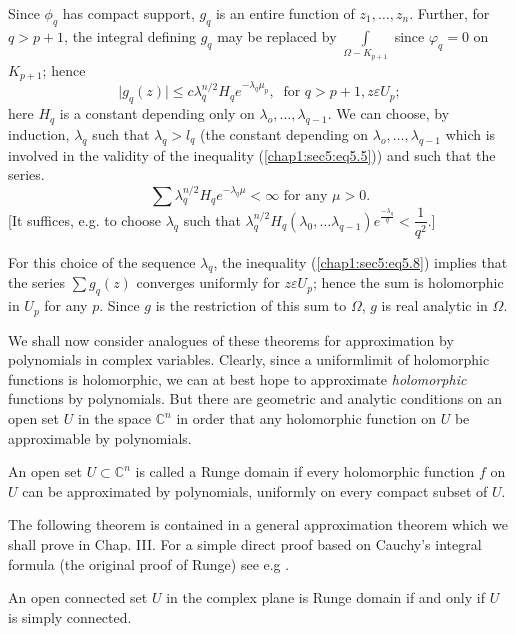 Since $\phi_q$ has compact support, $g_q$ is an entire function of
$z_1 , \ldots , z_n$. Further, for $q > p +1$, the integral defining
$g_q$ may be replaced by $\int\limits_{\Omega- {K}_{p +1}}$ since
$\varphi _q = 0$ on $K_{p+1}$; hence  
\begin{equation}
  \big | g_q (z) \big | \le c \lambda^{n/2}_q H_q e^{- \lambda_q
    \mu_p}, ~\text { for } q > p +1, z \varepsilon U_p ;
  \tag{5.8}\label{chap1:sec5:eq5.8}  
\end{equation}
here $H_q $ is a constant depending only on $\lambda_o , \ldots ,
\lambda_{q-1}$. We can choose, by induction, $\lambda_q$ such that
$\lambda_q > l_q$ (the constant depending on $\lambda_o , \ldots ,
\lambda_{q-1}$ which is involved in the validity of the inequality
(\ref{chap1:sec5:eq5.5})) and such that the series. 
$$
\sum \lambda^{n/2}_q H_q e^{-\lambda_q \mu} < \infty \text { for any } \mu > 0.
$$
[It suffices, e.g. to choose $\lambda_q$ such that $\lambda^{n/2}_q
  H_q (\lambda_0 , \ldots \lambda_{q-1}) e^{\frac{-\lambda_q}{q}} <
  \dfrac{1}{q^2}$.] 

For  this choice of the sequence $\lambda_q$, the inequality
(\ref{chap1:sec5:eq5.8})
implies that the series 
$\sum g_q (z)$ converges uniformly for $z \varepsilon U_p $; hence the sum is
holomorphic in $U_p$ for any $p$. Since $g$ is the restriction of this
sum to $\Omega$, $g$ is real analytic in $\Omega$. 

We shall now consider analogues of these theorems for approximation by
polynomials in complex variables. Clearly, since a uniform\pageoriginale limit of
holomorphic functions is holomorphic, we can at best hope to
approximate \textit{holomorphic} functions by polynomials. But there
are geometric and analytic conditions on an open set $U$ in the space
$\mathbb{C}^n$ in order that any holomorphic function on $U$ be
approximable by polynomials. 

\begin{defi*} %
  An open set $U \subset \mathbb{C}^n$ is called a Runge domain if
  every holomorphic function $f$ on $U$ can be approximated by
  polynomials, uniformly on every compact subset of $U$. 
\end{defi*}

The following theorem is contained in a general approximation theorem
which we shall prove in Chap. III. For a simple direct proof based
on Cauchy's integral formula (the original proof of Runge) see e.g \cite{4}. 

\begin{theorem*}[(Runge)] %
  An open connected set $U$ in the complex plane is Runge domain if
  and only if $U$ is simply connected. 
\end{theorem*}

